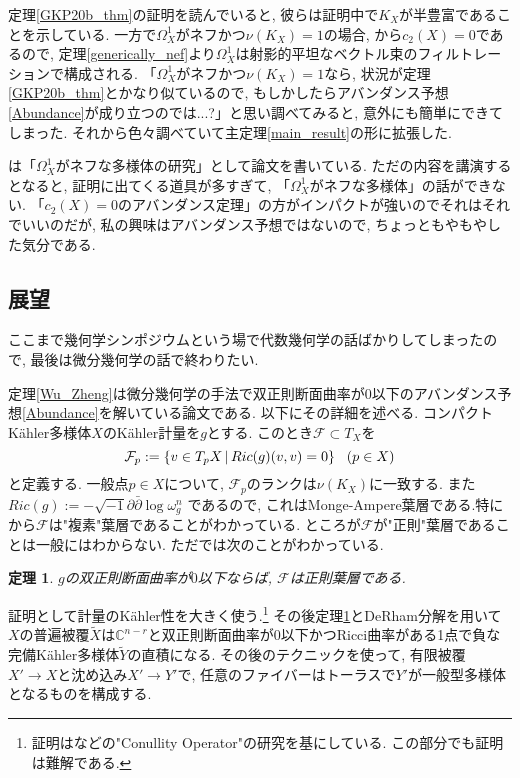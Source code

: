 \documentclass[12pt]{amsart}
\newtheorem{thm}{定理}[section]
\theoremstyle{definition}
\theoremstyle{remark}
\newcommand{\C}{\mathbb{C}}
\begin{document}
定理\ref{GKP20b_thm}の証明を読んでいると, 彼らは証明中で$K_X$が半豊富であることを示している. 
一方で$\Omega_{X}^{1}$がネフかつ$\nu(K_X)=1$の場合, \cite{DPS}から$c_2(X)=0$であるので, 定理\ref{generically_nef}より$\Omega_{X}^{1}$は射影的平坦なベクトル束のフィルトレーションで構成される. 
「$\Omega_{X}^{1}$がネフかつ$\nu(K_X)=1$なら, 状況が定理\ref{GKP20b_thm}とかなり似ているので, もしかしたらアバンダンス予想\ref{Abundance}が成り立つのでは...?」と思い調べてみると, 意外にも簡単にできてしまった. それから色々調べていて主定理\ref{main_result}の形に拡張した.

\cite{IM22}は「$\Omega_{X}^{1}$がネフな多様体の研究」として論文を書いている. ただ\cite{IM22}の内容を講演するとなると, 証明に出てくる道具が多すぎて, 「$\Omega_{X}^{1}$がネフな多様体」の話ができない. 「$c_2(X)=0$のアバンダンス定理」の方がインパクトが強いのでそれはそれでいいのだが, 私の興味はアバンダンス予想ではないので, ちょっともやもやした気分である.

\subsection{展望}
ここまで幾何学シンポジウムという場で代数幾何学の話ばかりしてしまったので, 最後は微分幾何学の話で終わりたい. 

定理\ref{Wu_Zheng}は微分幾何学の手法で双正則断面曲率が$0$以下のアバンダンス予想\ref{Abundance}を解いている論文である.
以下にその詳細を述べる.
コンパクトK\"ahler多様体$X$のK\"ahler計量を$g$とする. 
このとき$\mathcal{F} \subset T_X$を
\begin{equation}
\label{ricci_foliation}
\mathcal{F}_{p} := \{v \in T_{p}X  \,|\, Ric(g)(v,v)=0 \}
\text{\,\,\, ($p \in X$)}
\end{equation}
と定義する. 一般点$p \in X$について, $\mathcal{F}_p$のランクは$\nu(K_X)$に一致する.
また$Ric(g) := - \sqrt{-1} \partial \bar{\partial} \log \omega_{g}^{n}$ であるので, これはMonge-Ampere葉層である.特に\cite{BT87}から$\mathcal{F}$は"複素"葉層であることがわかっている.  ところが$\mathcal{F}$が"正則"葉層であることは一般にはわからない.
ただ\cite{WZ02}では次のことがわかっている.
\begin{thm}\cite{WZ02}
\label{foliation}
$g$の双正則断面曲率が$0$以下ならば, $\mathcal{F}$は正則葉層である.
\end{thm}
証明として計量のK\"ahler性を大きく使う.\footnote{証明は\cite{Fer70}などの"Conullity Operator"の研究を基にしている. この部分でも証明は難解である.}
その後定理\ref{foliation}とDeRham分解を用いて$X$の普遍被覆$\tilde{X}$は$\C^{n-r}$と双正則断面曲率が0以下かつRicci曲率がある1点で負な完備K\"ahler多様体$\tilde{Y}$の直積になる.
その後\cite{Nad90}のテクニックを使って, 有限被覆$X' \rightarrow X$と沈め込み$X' \rightarrow Y'$で, 任意のファイバーはトーラスで$Y'$が一般型多様体となるものを構成する.
\end{document}
